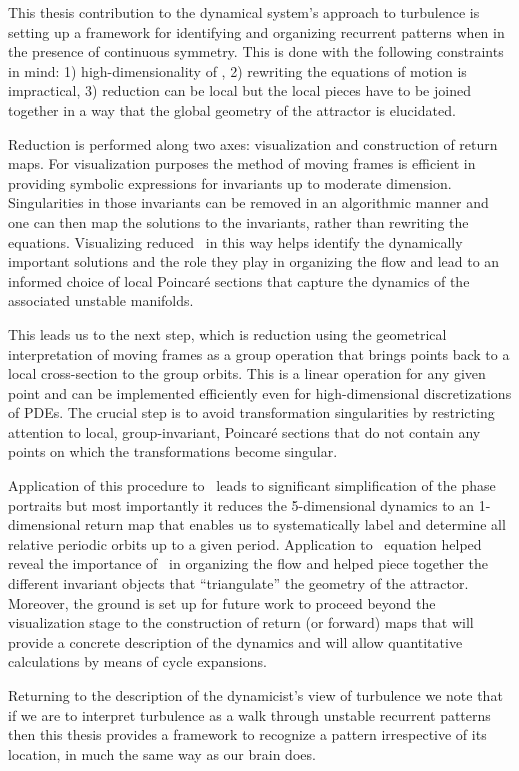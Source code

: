 
This thesis contribution to the dynamical system's approach to
turbulence is setting up a framework for identifying and
organizing recurrent patterns when in the presence of continuous
symmetry. This is done with the following
constraints in mind: 1) high-dimensionality of \statesp, 2)
rewriting the equations of motion is impractical, 3) reduction
can be local but the local pieces have to be joined together in
a way that the global geometry of the attractor is elucidated.

Reduction is performed along two axes: visualization and construction of return maps.
For visualization purposes the method of moving frames is efficient in providing
symbolic expressions for invariants up to moderate dimension. Singularities
in those invariants can be removed in an algorithmic manner and one can then map the
solutions to the invariants, rather than rewriting the equations. Visualizing
reduced \statesp\ in this way helps identify the dynamically important solutions and the role they
play in organizing the flow and lead to an informed choice of local Poincar\'e sections
that capture the dynamics of the associated unstable manifolds.

This leads us to the next step, which is reduction using the geometrical interpretation
of moving frames as a group operation that brings points back to a local cross-section to the
group orbits. This is a linear operation for any given point and can be implemented efficiently
even for high-dimensional discretizations of PDEs. The crucial step is to avoid transformation
singularities by restricting attention to local, group-invariant, Poincar\'e sections that
do not contain any points on which the transformations become singular.

Application of this procedure to \CLe\ leads to significant
simplification of the phase portraits but most importantly it
reduces the 5-dimensional dynamics to an 1-dimensional return
map that enables us to systematically label and determine all
relative periodic orbits up to a given period. Application to
\KS\ equation helped reveal the importance of \reqva\ in
organizing the flow and helped piece together the different
invariant objects that ``triangulate'' the geometry of the
attractor. Moreover, the ground is set up for future work to
proceed beyond the visualization stage to the construction of
return (or forward) maps that will provide a concrete
description of the dynamics and will allow quantitative
calculations by means of cycle expansions.

Returning to the description of the dynamicist's view of turbulence we note that if we are to
interpret turbulence as a walk through unstable recurrent patterns then this thesis provides
a framework to recognize a pattern irrespective of its location, in much the same way as our brain
does.
